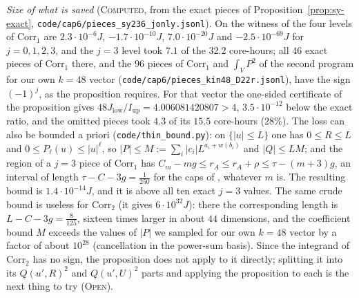 \documentclass[11pt]{amsart}
\theoremstyle{definition}
\theoremstyle{remark}
\newcommand{\lbl}[1]{\textup{\textsc{#1}}}
\begin{document}
\begin{sloppypar}\noindent\emph{Size of what is saved} (\lbl{Computed}, from the exact pieces
of Proposition~\ref{prop:sy-exact}, \texttt{code/cap6/pieces\_sy236\_jonly.jsonl}).
On the witness of \cite{SY26} the four levels of $\mathrm{Corr}_1$ are
$2.3\cdot10^{-6}J$, $-1.7\cdot10^{-10}J$, $7.0\cdot10^{-20}J$ and
$-2.5\cdot10^{-69}J$ for $j=0,1,2,3$, and the $j=3$ level took $7.1$ of the
$32.2$ core-hours; all $46$ exact pieces of $\mathrm{Corr}_1$ there, and the
$96$ pieces of $\mathrm{Corr}_1$ and $\int_VP^2$ of the second program
for our own $k=48$ vector (\texttt{code/cap6/pieces\_kin48\_D22r.jsonl}), have
the sign $(-1)^j$, as the proposition requires. For that vector the one-sided
certificate of the proposition gives $48J_{\mathrm{low}}/I_{\mathrm{up}}=4.006081420807>4$,
$3.5\cdot10^{-12}$ below the exact ratio, and the omitted pieces took $4.3$ of
its $15.5$ core-hours ($28\%$). The loss can also be bounded a
priori (\texttt{code/thin\_bound.py}): on $\{|u|\le L\}$ one has
$0\le R\le L$ and $0\le P_\ell(u)\le|u|^\ell$, so $|P|\le M:=\sum_i|c_i|L^{a_i+w(b_i)}$
and $|Q|\le LM$; and the region of a $j=3$ piece of $\mathrm{Corr}_1$ has
$C_m-mg\le r_A\le r_A+\rho\le\tau-(m+3)g$, an interval of length
$\tau-C-3g=\frac{1}{250}$ for the caps of \cite{Kin26,SY26}, whatever $m$ is.
The resulting bound is $1.4\cdot10^{-14}J$, and it is above all ten exact
$j=3$ values. The same crude bound is useless for $\mathrm{Corr}_2$ (it gives
$6\cdot10^{32}J$): there the corresponding length is
$L-C-3g=\frac{8}{125}$, sixteen times larger in about $44$ dimensions, and the
coefficient bound $M$ exceeds the values of $|P|$ we sampled for our own
$k=48$ vector by a factor of about $10^{28}$ (cancellation in the power-sum basis). Since the integrand of
$\mathrm{Corr}_2$ has no sign, the proposition does not apply to it directly;
splitting it into its $Q(u',R)^2$ and $Q(u',U)^2$ parts and applying the
proposition to each is the next thing to try (\lbl{Open}).
\end{sloppypar}
\end{document}
